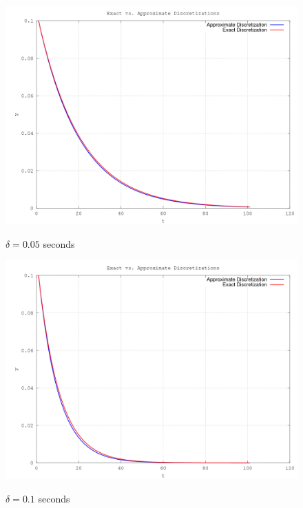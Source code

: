 \documentclass[10pt,a4paper]{article}
\begin{document}
 
\begin{center}
	\begin{figure}[H]
			  \includegraphics[scale=0.5]{figures/Question5Delta005.png} 
	          \label{fig:Q5Delta1}
	\caption{ $\delta = 0.05$  seconds}
	\end{figure}
	
	\begin{figure}[H]
			  \includegraphics[scale=0.5]{figures/Question5Delta01.png} 
	          \label{fig:Q5Delta2}
	\caption{ $\delta = 0.1$  seconds}
	\end{figure}


\end{center}
\end{document}

